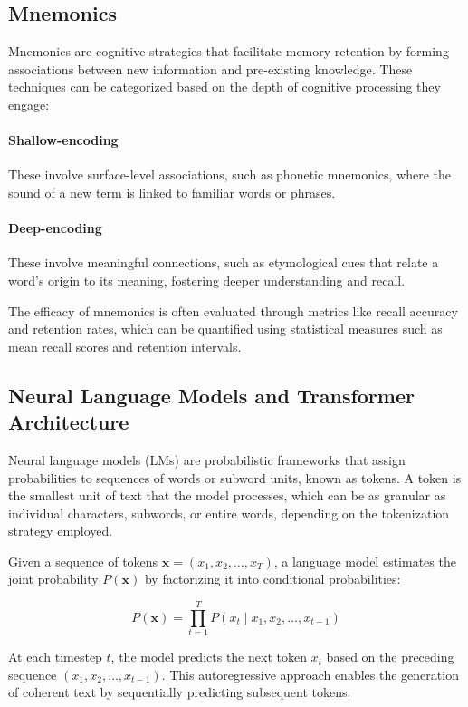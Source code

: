 \documentclass{article}
\newcounter{para}
\begin{document}
\subsection{Mnemonics} \label{sec:pre-mnemonics}

Mnemonics are cognitive strategies that facilitate memory retention by forming associations between new information and pre-existing knowledge. These techniques can be categorized based on the depth of cognitive processing they engage:

\paragraph{Shallow-encoding} These involve surface-level associations, such as phonetic mnemonics, where the sound of a new term is linked to familiar words or phrases.
\paragraph{Deep-encoding} These involve meaningful connections, such as etymological cues that relate a word's origin to its meaning, fostering deeper understanding and recall.

The efficacy of mnemonics is often evaluated through metrics like recall accuracy and retention rates, which can be quantified using statistical measures such as mean recall scores and retention intervals.

\subsection{Neural Language Models and Transformer Architecture} \label{sec:pre-lm}

Neural language models (LMs) are probabilistic frameworks that assign probabilities to sequences of words or subword units, known as tokens. A token is the smallest unit of text that the model processes, which can be as granular as individual characters, subwords, or entire words, depending on the tokenization strategy employed.

Given a sequence of tokens \( \mathbf{x} = (x_1, x_2, \ldots, x_T) \), a language model estimates the joint probability \( P(\mathbf{x}) \) by factorizing it into conditional probabilities:

\[
P(\mathbf{x}) = \prod_{t=1}^T P(x_t \mid x_1, x_2, \ldots, x_{t-1})
\]

At each timestep \( t \), the model predicts the next token \( x_t \) based on the preceding sequence \( (x_1, x_2, \ldots, x_{t-1}) \). This autoregressive approach enables the generation of coherent text by sequentially predicting subsequent tokens.
\end{document}
